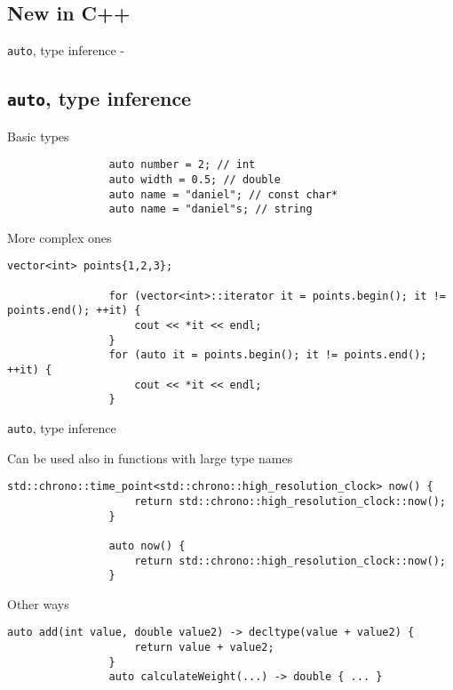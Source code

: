 \documentclass{beamer}
\newcommand{\normalSizeItem}[1] {
  \normalsize{\item #1}
}
\newcommand{\newFrameWithoutIndex}[1]{
	\begin{frame}
		#1
		\thispagestyle{empty}
	\end{frame}
}
\newcommand{\newSectionWithoutIndex}[1]{
	\newFrameWithoutIndex{\section{#1}}
}
\newcommand{\smallCite}[1]{
	\begin{small}
		\cite{#1}	
	\end{small}
}
\begin{document}
		\newSectionWithoutIndex{New in C++}	
		
		\begin{frame}[fragile]{\texttt{auto}, type inference -\smallCite{cppReference}}\subsection{\texttt{auto}, type inference}	
			\begin{itemize}
			
				\normalSizeItem{Basic types}
				\begin{lstlisting}
				auto number = 2; // int
				auto width = 0.5; // double
				auto name = "daniel"; // const char*
				auto name = "daniel"s; // string
				\end{lstlisting}
				
				\normalSizeItem{More complex ones}
				\begin{lstlisting}[basicstyle={\tiny\ttfamily}]
				vector<int> points{1,2,3};
				
				for (vector<int>::iterator it = points.begin(); it != points.end(); ++it) {
					cout << *it << endl;
				}
				for (auto it = points.begin(); it != points.end(); ++it) {
					cout << *it << endl;
				}
				\end{lstlisting}
				
			\end{itemize}
		\end{frame}
		
		\begin{frame}[fragile]{\texttt{auto}, type inference}	
			\begin{itemize}
			
				\normalSizeItem{Can be used also in functions with large type names}
				\begin{lstlisting}[basicstyle={\tiny\ttfamily}]
				std::chrono::time_point<std::chrono::high_resolution_clock> now() {
					return std::chrono::high_resolution_clock::now();
				}
				
				auto now() {
					return std::chrono::high_resolution_clock::now();
				}
				\end{lstlisting}
								
				\normalSizeItem { Other ways }
				\begin{lstlisting}[basicstyle={\tiny\ttfamily}]
				auto add(int value, double value2) -> decltype(value + value2) {
					return value + value2;
				}
				auto calculateWeight(...) -> double { ... }
				\end{lstlisting}
				
			\end{itemize}
		\end{frame}
		
\end{document}

